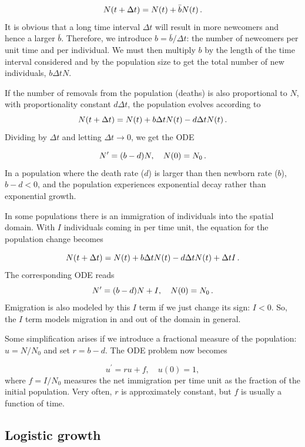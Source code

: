 \documentclass[%
oneside,                 %
final,                   %
10pt]{article}
\begin{document}
\[ N(t+\Delta t) = N(t) + \bar bN(t)\tp  \]
It is obvious that a long time interval $\Delta t$ will result in
more newcomers and hence a larger $\bar b$. Therefore, we introduce
$b=\bar b/\Delta t$: the number of newcomers per unit time and per
individual. We must then multiply $b$ by the length of the time
interval considered and by the population size to get the
total number of new individuals, $b\Delta t N$.

If the number of removals from the population (deaths) is also
proportional to $N$, with proportionality constant $d\Delta t$,
the population evolves according to
\[ N(t+\Delta t) = N(t) + b\Delta t N(t) - d\Delta t N(t)\tp  \]
Dividing by $\Delta t$ and letting $\Delta t \rightarrow 0$,
we get the ODE

\begin{equation}
N^{\prime} = (b-d)N,\quad N(0)=N_0\tp
\end{equation}
In a population where the death rate ($d$) is larger than
then newborn rate ($b$), $b-d < 0$, and the population experiences
exponential decay rather than exponential growth.

In some populations there is an immigration of individuals into the
spatial domain. With $I$ individuals coming in per time unit,
the equation for the population change becomes

\[ N(t+\Delta t) = N(t) + b\Delta t N(t) - d\Delta t N(t) + \Delta t I\tp  \]
The corresponding ODE reads
\begin{equation}
N^{\prime} = (b-d)N + I,\quad N(0)=N_0
\tp
\end{equation}
Emigration is also modeled by this $I$ term if we just change its sign: $I < 0$.
So, the $I$ term models migration in and out of the domain in general.

Some simplification arises if we introduce a fractional measure
of the population: $u=N/N_0$ and set $r=b-d$. The ODE problem
now becomes

\begin{equation}
u^{\prime} = ru + f,\quad u(0)=1,
\label{decay:app:pop:ueq}
\end{equation}
where $f=I/N_0$ measures the net immigration per time unit as
the fraction of the initial population. Very often, $r$ is approximately
constant, but $f$ is usually a function of time.

\subsection{Logistic growth}
\label{decay:app:pop:log}
\end{document}
